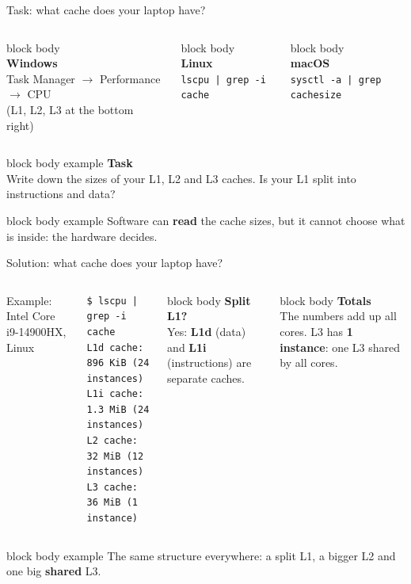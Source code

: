 \documentclass[aspectratio=169,10pt]{beamer}
\newcommand{\stepbox}[2]{%
  \begin{beamercolorbox}[rounded=true,sep=0.09cm,wd=\linewidth]{block body}
    \footnotesize\textbf{#1}\\ #2
  \end{beamercolorbox}\vspace{0.06cm}}
\newcommand{\taskhead}[2]{%
  \begin{beamercolorbox}[rounded=true,sep=0.12cm,wd=\linewidth]{block body example}
    \small\textbf{#1}\\[0.04cm]
    \footnotesize #2
  \end{beamercolorbox}\vspace{0.1cm}}
\newcommand{\keymsg}[1]{%
  \begin{beamercolorbox}[rounded=true,sep=0.1cm,wd=\textwidth]{block body example}
    \centering\footnotesize #1
  \end{beamercolorbox}}
\begin{document}
\begin{frame}{Task: what cache does your laptop have?}
  \begin{columns}[T,onlytextwidth]
      \begin{beamercolorbox}[rounded=true,sep=0.14cm,wd=\linewidth]{block body}
        \centering{\Huge\textcolor{DeepBlue}{\faWindows}}\\[0.12cm]
        \small\textbf{Windows}\\[0.05cm]
        \footnotesize Task Manager $\rightarrow$ Performance $\rightarrow$ CPU\\
        (L1, L2, L3 at the bottom right)
      \end{beamercolorbox}
      \begin{beamercolorbox}[rounded=true,sep=0.14cm,wd=\linewidth]{block body}
        \centering{\Huge\textcolor{DeepBlue}{\faLinux}}\\[0.12cm]
        \small\textbf{Linux}\\[0.05cm]
        \footnotesize\texttt{lscpu | grep -i cache}\\ \phantom{x}
      \end{beamercolorbox}
      \begin{beamercolorbox}[rounded=true,sep=0.14cm,wd=\linewidth]{block body}
        \centering{\Huge\textcolor{DeepBlue}{\faApple}}\\[0.12cm]
        \small\textbf{macOS}\\[0.05cm]
        \footnotesize\texttt{sysctl -a | grep cachesize}\\ \phantom{x}
      \end{beamercolorbox}
  \end{columns}
  \vspace{0.2cm}
  \taskhead{Task}{Write down the sizes of your L1, L2 and L3 caches. Is your L1 split into instructions and data?}
  \vfill
  \keymsg{Software can \textbf{read} the cache sizes, but it cannot choose what is inside: the hardware decides.}
\end{frame}

\begin{frame}[fragile]{Solution: what cache does your laptop have?}
  \begin{columns}[c,onlytextwidth]
      {\scriptsize Example: Intel Core i9-14900HX, Linux\par}
\begin{lstlisting}[style=asm]
$ lscpu | grep -i cache
L1d cache:  896 KiB (24 instances)
L1i cache:  1.3 MiB (24 instances)
L2 cache:   32 MiB (12 instances)
L3 cache:   36 MiB (1 instance)
\end{lstlisting}
      \stepbox{Split L1?}{Yes: \textbf{L1d} (data) and \textbf{L1i} (instructions) are separate caches.}
      \stepbox{Totals}{The numbers add up all cores. L3 has \textbf{1 instance}: one L3 shared by all cores.}
  \end{columns}
  \vfill
  \keymsg{The same structure everywhere: a split L1, a bigger L2 and one big \textbf{shared} L3.}
\end{frame}
\end{document}
